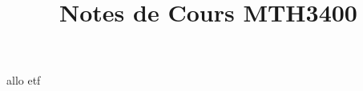 \documentclass[letterpaper,oneside]{tufte-handout}
\title{Notes de Cours MTH3400}
\begin{document}
\maketitle
allo etf  

\nocite{*}


\end{document}
